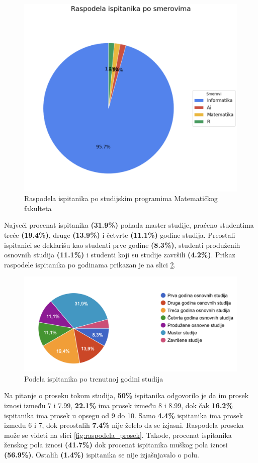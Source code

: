 \documentclass[a4paper]{article}
\begin{document}
{\begin{figure}[H]
    \centering
    \includegraphics[width=0.5\linewidth]{raspodela_ispitanika.png}
    \caption{Raspodela ispitanika po studijskim programima Matematičkog fakulteta}
    \label{fig:raspodela_smerovi}
\end{figure}


Najveći procenat ispitanika \textbf{(31.9\%)} pohađa master studije, praćeno studentima treće \textbf{(19.4\%)}, druge \textbf{(13.9\%)} i četvrte \textbf{(11.1\%)} godine studija. Preostali ispitanici se deklarišu kao studenti prve godine \textbf{(8.3\%)}, studenti produženih osnovnih studija \textbf{(11.1\%)} i studenti koji su studije završili \textbf{(4.2\%)}. Prikaz raspodele ispitanika po godinama prikazan je na slici \ref{fig:raspodela_godine}.

\begin{figure}[H]
    \centering
    \includegraphics[width=0.8\linewidth]{raspodela_godine.png}
    \caption{Podela ispitanika po trenutnoj godini studija}
    \label{fig:raspodela_godine}
\end{figure}


Na pitanje o proseku tokom studija, \textbf{50\%} ispitanika odgovorilo je da im prosek iznosi između 7 i 7.99, \textbf{22.1\%} ima prosek između 8 i 8.99, dok čak \textbf{16.2\%} ispitanika ima prosek u opsegu od 9 do 10. Samo \textbf{4.4\%} ispitanika ima prosek između 6 i 7, dok preostalih \textbf{7.4\%} nije želelo da se izjasni. Raspodela proseka može se videti na slici \ref{fig:raspodela_prosek}. Takođe, procenat ispitanika ženskog pola iznosi \textbf{(41.7\%)} dok procenat ispitanika muškog pola iznosi \textbf{(56.9\%)}. Ostalih \textbf{(1.4\%)} ispitanika se nije izjašnjavalo o polu.

}
\end{document}
